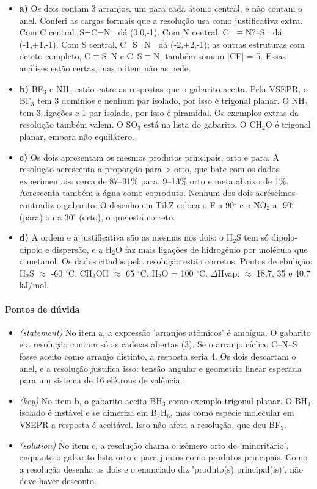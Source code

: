 \documentclass{article}%
\begin{document}
\begin{itemize}%
\item%
\textbf{a)} Os dois contam 3 arranjos, um para cada átomo central, e não contam o anel. Conferi as cargas formais que a resolução usa como justificativa extra. Com C central, S=C=N$^{-}$ dá (0,0,-1). Com N central, C$^{-}$$\equiv$N?--S$^{-}$ dá (-1,+1,-1). Com S central, C=S=N$^{-}$ dá (-2,+2,-1); as outras estruturas com octeto completo, C$\equiv$S--N e C--S$\equiv$N, também somam |CF| = 5. Essas análises estão certas, mas o item não as pede.%
\item%
\textbf{b)} BF$_{3}$ e NH$_{3}$ estão entre as respostas que o gabarito aceita. Pela VSEPR, o BF$_{3}$ tem 3 domínios e nenhum par isolado, por isso é trigonal planar. O NH$_{3}$ tem 3 ligações e 1 par isolado, por isso é piramidal. Os exemplos extras da resolução também valem. O SO$_{3}$ está na lista do gabarito. O CH$_{2}$O é trigonal planar, embora não equilátero.%
\item%
\textbf{c)} Os dois apresentam os mesmos produtos principais, orto e para. A resolução acrescenta a proporção para > orto, que bate com os dados experimentais: cerca de 87--91\% para, 9--13\% orto e meta abaixo de 1\%. Acrescenta também a água como coproduto. Nenhum dos dois acréscimos contradiz o gabarito. O desenho em TikZ coloca o F a 90$^\circ$ e o NO$_{2}$ a -90$^\circ$ (para) ou a 30$^\circ$ (orto), o que está correto.%
\item%
\textbf{d)} A ordem e a justificativa são as mesmas nos dois: o H$_{2}$S tem só dipolo{-}dipolo e dispersão, e a H$_{2}$O faz mais ligações de hidrogênio por molécula que o metanol. Os dados citados pela resolução estão corretos. Pontos de ebulição: H$_{2}$S $\approx$ -60 $^\circ$C, CH$_{3}$OH $\approx$ 65 $^\circ$C, H$_{2}$O = 100 $^\circ$C. $\Delta$Hvap: $\approx$ 18,7, 35 e 40,7 kJ/mol.%
\end{itemize}%
\paragraph{Pontos de dúvida}%
\begin{itemize}%
\item%
\textit{(statement)} No item a, a expressão 'arranjos atômicos' é ambígua. O gabarito e a resolução contam só as cadeias abertas (3). Se o arranjo cíclico C--N--S fosse aceito como arranjo distinto, a resposta seria 4. Os dois descartam o anel, e a resolução justifica isso: tensão angular e geometria linear esperada para um sistema de 16 elétrons de valência.%
\item%
\textit{(key)} No item b, o gabarito aceita BH$_{3}$ como exemplo trigonal planar. O BH$_{3}$ isolado é instável e se dimeriza em B$_{2}$H$_{6}$, mas como espécie molecular em VSEPR a resposta é aceitável. Isso não afeta a resolução, que deu BF$_{3}$.%
\item%
\textit{(solution)} No item c, a resolução chama o isômero orto de 'minoritário', enquanto o gabarito lista orto e para juntos como produtos principais. Como a resolução desenha os dois e o enunciado diz 'produto(s) principal(is)', não deve haver desconto.%
\end{itemize}%
\end{document}

